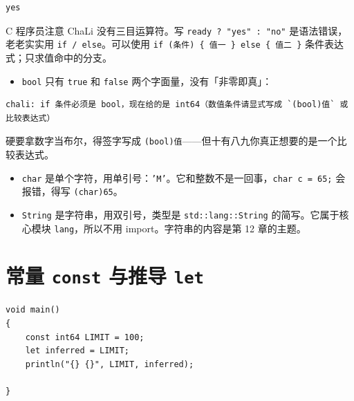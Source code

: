 \par
\medskip
\begin{lstlisting}[style=out]
yes
\end{lstlisting}
\par
\medskip

\begin{tip}{C 程序员注意}
ChaLi 没有三目运算符。写 \texttt{ready ? "yes" :\allowbreak{} "no"} 是语法错误，老老实实用 \texttt{if /\allowbreak{} else}。可以使用 \texttt{if (\allowbreak{}条件)\allowbreak{} \{ 值一 \} else \{ 值二 \}} 条件表达式；只求值命中的分支。
\end{tip}

\begin{itemize}

\item \texttt{bool} 只有 \texttt{true} 和 \texttt{false} 两个字面量，没有「非零即真」：

\end{itemize}

\par
\medskip
\begin{lstlisting}[style=out]
chali: if 条件必须是 bool，现在给的是 int64（数值条件请显式写成 `(bool)值` 或比较表达式）
\end{lstlisting}
\par
\medskip

硬要拿数字当布尔，得签字写成 \texttt{(\allowbreak{}bool)\allowbreak{}值}——但十有八九你真正想要的是一个比较表达式。

\begin{itemize}

\item \texttt{char} 是单个字符，用单引号：\texttt{'M'}。它和整数不是一回事，\texttt{char c =\allowbreak{} 65;} 会报错，得写 \texttt{(\allowbreak{}char)\allowbreak{}65}。

\item \texttt{String} 是字符串，用双引号，类型是 \texttt{std:\allowbreak{}:\allowbreak{}lang:\allowbreak{}:\allowbreak{}String} 的简写。它属于核心模块 \texttt{lang}，所以不用 import。字符串的内容是第 12 章的主题。

\end{itemize}

\section{常量 \texttt{const} 与推导 \texttt{let}}

\par
\medskip
\begin{lstlisting}[style=chali]
void main()
{
    const int64 LIMIT = 100;
    let inferred = LIMIT;
    println("{} {}", LIMIT, inferred);

}
\end{lstlisting}
\par
\medskip

